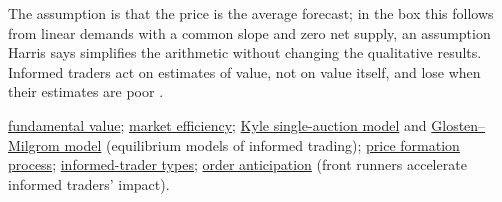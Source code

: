 \begin{qfresult}
The assumption is that the price is the average forecast; in the box this follows from linear demands with a common slope and zero net supply, an assumption Harris says simplifies the arithmetic without changing the qualitative results. Informed traders act on estimates of value, not on value itself, and lose when their estimates are poor \citep[same chap., p.~223]{alpha-harris}.

 \hyperref[def:fundamental-value]{fundamental value}; \hyperref[def:market-efficiency]{market efficiency}; \hyperref[mod:kyle-single-auction]{Kyle single-auction model} and \hyperref[mod:glosten-milgrom]{Glosten--Milgrom model} (equilibrium models of informed trading); \hyperref[def:price-formation-process]{price formation process}; \hyperref[def:informed-trader-types]{informed-trader types}; \hyperref[def:order-anticipation]{order anticipation} (front runners accelerate informed traders' impact).

\end{qfresult}

